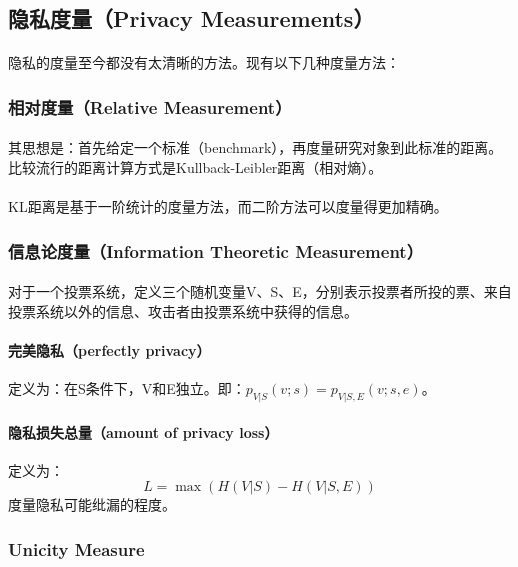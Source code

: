 \documentclass[12pt,a4paper]{article}
\begin{document}
\subsection{隐私度量（Privacy Measurements）}
\paragraph{}隐私的度量至今都没有太清晰的方法。现有以下几种度量方法：

	\subsubsection{相对度量（Relative Measurement）}
	\paragraph{} 其思想是：首先给定一个标准（benchmark），再度量研究对象到此标准的距离。比较流行的距离计算方式是Kullback-Leibler距离（相对熵）。
	\paragraph{} KL距离是基于一阶统计的度量方法，而二阶方法可以度量得更加精确。

	\subsubsection{信息论度量（Information Theoretic Measurement）}
	\paragraph{} 对于一个投票系统，定义三个随机变量V、S、E，分别表示投票者所投的票、来自投票系统以外的信息、攻击者由投票系统中获得的信息。
	\paragraph{完美隐私（perfectly privacy）} 定义为：在S条件下，V和E独立。即：$p_{V|S}(v;s) = p_{V|S,E}(v;s,e)$。
	\paragraph{隐私损失总量（amount of privacy loss）} 定义为：
	\begin{equation}
		L = \max (H(V|S) - H(V|S,E))
	\end{equation}
	度量隐私可能纰漏的程度。
	
	\subsubsection{Unicity Measure}
\end{document}
